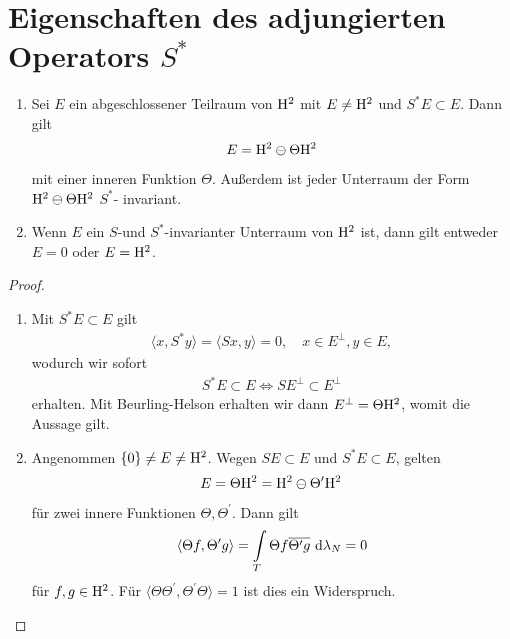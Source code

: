 \section{Eigenschaften des adjungierten Operators $ S^\ast $}

\begin{sz}
	\begin{enumerate}[label=\text{\textbf{(\arabic*)}}]
		\item 
		Sei $ E $ ein abgeschlossener Teilraum von $ \mathrm{H}^2 $ mit $ E \neq \mathrm{H}^2 $ und $ S^\ast E \subset E $.
		Dann gilt 
		\begin{align*}
		E = \mathrm{H}^2 \ominus \Theta \mathrm{H}^2
		\end{align*}
		mit einer inneren Funktion $ \Theta $.
		Außerdem ist jeder Unterraum der Form $ \mathrm{H}^2 \ominus \Theta \mathrm{H}^2 $
		$ S^\ast $-  invariant.	
		
		\item
		Wenn $ E $ ein $ S $-und $ S^\ast $-invarianter Unterraum von $ \mathrm{H}^2 $ ist, dann gilt entweder $ E = {0} $ oder $ E = \mathrm{H}^2 $.
	\end{enumerate}
\end{sz}

\begin{proof}
	\begin{enumerate}[label=\text{\textbf{(\arabic*)}}]
		\item 
		Mit $ S^\ast E \subset E $ gilt
		\begin{align*}
		\langle x , S^\ast y \rangle =
		\langle S x ,  y \rangle = 0, \quad x \in E^\bot, y \in E,
		\end{align*}
		wodurch wir sofort
		\begin{align*}
		S^\ast E \subset E \Leftrightarrow S E^\bot \subset E^\bot
		\end{align*}
		erhalten. Mit Beurling-Helson erhalten wir dann $ E^\bot = \Theta \mathrm{H}^2 $, womit die Aussage gilt.
		
		\item
		Angenommen $ \lbrace 0 \rbrace \neq E \neq \mathrm{H}^2 $.
		Wegen $ S E \subset E  $ und $ S^\ast E \subset E $, gelten 
		\begin{align*}
		E = \Theta \mathrm{H}^2 = \mathrm{H}^2 \ominus \Theta^\prime \mathrm{H}^2
		\end{align*}
		für zwei innere Funktionen $ \Theta, \Theta^\prime$.
		Dann gilt 
		\begin{align*}
		\langle \Theta f , \Theta^\prime g \rangle   
		=
		\int \limits_{T} \Theta f \overline{\Theta^\prime g}  \ \text{\rmfamily d} \lambda_N = 0
		\end{align*}
		für $ f, g \in \mathrm{H}^2 $. Für $ \langle \Theta \Theta^\prime, \Theta^\prime \Theta \rangle = 1 $ ist dies ein Widerspruch.		
		\end{enumerate}
\end{proof}

